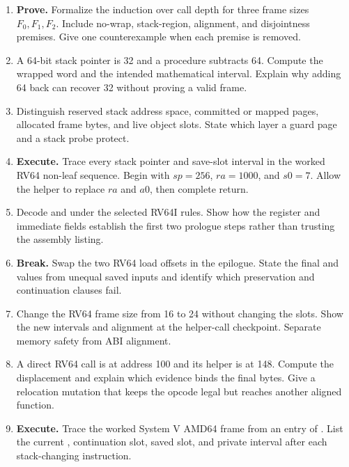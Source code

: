 \begin{enumerate}
\item \textbf{Prove.} Formalize the induction over call depth for three frame
sizes \(F_0,F_1,F_2\). Include no-wrap, stack-region, alignment, and disjointness
premises. Give one counterexample when each premise is removed.

\item A 64-bit stack pointer is 32 and a procedure subtracts 64. Compute the
wrapped word and the intended mathematical interval. Explain why adding 64
back can recover 32 without proving a valid frame.

\item Distinguish reserved stack address space, committed or mapped pages,
allocated frame bytes, and live object slots. State which layer a guard page
and a stack probe protect.

\item \textbf{Execute.} Trace every stack pointer and save-slot interval in the
worked RV64 non-leaf sequence. Begin with \(sp=256\), \(ra=1000\), and
\(s0=7\). Allow the helper to replace \(ra\) and \(a0\), then complete return.

\item Decode  and  under the selected
RV64I rules. Show how the register and immediate fields establish the first
two prologue steps rather than trusting the assembly listing.

\item \textbf{Break.} Swap the two RV64 load offsets in the epilogue. State the
final  and  values from unequal saved inputs and identify
which preservation and continuation clauses fail.

\item Change the RV64 frame size from 16 to 24 without changing the slots.
Show the new intervals and alignment at the helper-call checkpoint. Separate
memory safety from ABI alignment.

\item A direct RV64 call is at address 100 and its helper is at 148. Compute
the displacement and explain which evidence binds the final  bytes.
Give a relocation mutation that keeps the opcode legal but reaches another
aligned function.

\item \textbf{Execute.} Trace the worked System V AMD64 frame from an entry
 of . List the current , continuation slot,
saved  slot, and private interval after each stack-changing
instruction.


\end{enumerate}

